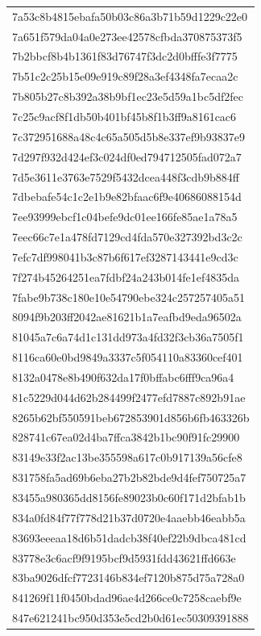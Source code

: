 \begin{tabular}{l}
7a53c8b4815ebafa50b03c86a3b71b59d1229c22e0 \\
7a651f579da04a0e273ee42578cfbda370875373f5 \\
7b2bbcf8b4b1361f83d76747f3dc2d0bfffe3f7775 \\
7b51c2c25b15e09e919c89f28a3ef4348fa7ecaa2c \\
7b805b27c8b392a38b9bf1ec23e5d59a1bc5df2fec \\
7c25c9acf8f1db50b401bf45b8f1b3ff9a8161cac6 \\
7c372951688a48c4c65a505d5b8e337ef9b93837e9 \\
7d297f932d424ef3c024df0ed794712505fad072a7 \\
7d5e3611e3763e7529f5432dcea448f3cdb9b884ff \\
7dbebafe54c1c2e1b9e82bfaac6f9e40686088154d \\
7ee93999ebcf1c04befe9dc01ee166fe85ae1a78a5 \\
7eec66c7e1a478fd7129cd4fda570e327392bd3c2c \\
7efc7df998041b3c87b6f617ef3287143441e9cd3c \\
7f274b45264251ea7fdbf24a243b014fe1ef4835da \\
7fabe9b738c180e10e54790ebe324c257257405a51 \\
8094f9b203ff2042ae81621b1a7eafbd9eda96502a \\
81045a7c6a74d1c131dd973a4fd32f3cb36a7505f1 \\
8116ca60e0bd9849a3337c5f054110a83360cef401 \\
8132a0478e8b490f632da17f0bffabc6fff9ca96a4 \\
81c5229d044d62b284499f2477efd7887c892b91ae \\
8265b62bf550591beb672853901d856b6fb463326b \\
828741c67ea02d4ba7ffca3842b1bc90f91fc29900 \\
83149e33f2ac13be355598a617c0b917139a56cfe8 \\
831758fa5ad69b6eba27b2b82bde9d4fef750725a7 \\
83455a980365dd8156fe89023b0c60f171d2bfab1b \\
834a0fd84f77f778d21b37d0720e4aaebb46eabb5a \\
83693eeeaa18d6b51dadcb38f40ef22b9dbca481cd \\
83778e3c6acf9f9195bcf9d5931fdd43621ffd663e \\
83ba9026dfcf7723146b834ef7120b875d75a728a0 \\
841269f11f0450bdad96ae4d266ce0c7258caebf9e \\
847e621241bc950d353e5cd2b0d61ec50309391888 \\

\end{tabular}

